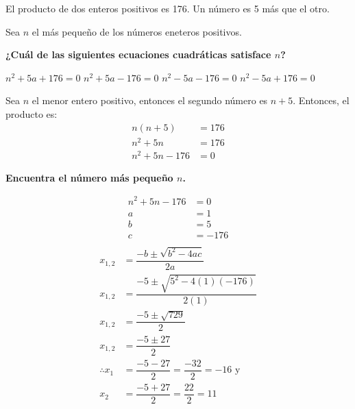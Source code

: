 El producto de dos enteros positivos es 176. Un número es 5 más que el otro.

Sea $n$ el más pequeño de los números eneteros positivos.\\
\begin{subparts}
    \subpart  \textbf{¿Cuál de las siguientes ecuaciones cuadráticas satisface $n$?}

    \begin{oneparchoices}
        \choice $n^2+5a+176=0$
        \CorrectChoice $n^2+5a-176=0$
        \choice $n^2-5a-176=0$
        \choice $n^2-5a+176=0$
    \end{oneparchoices}

    \begin{solutionbox}{4cm}
        Sea $n$ el menor entero positivo, entonces el segundo número es $n+5$. Entonces, el producto es:
        \begin{align*}
            n(n+5)     & =176 \\
            n^2+5n     & =176 \\
            n^2+5n-176 & =0
        \end{align*}
    \end{solutionbox}

    \subpart \textbf{Encuentra el número más pequeño $n$.}

    \begin{solutionbox}{13cm}
        \begin{align*}
            n^2+5n-176 & =0    \\
            a          & =1    \\
            b          & =5    \\
            c          & =-176 \\
        \end{align*}
        \begin{align*}
            x_{1,2}        & = \dfrac{-b\pm\sqrt{b^2-4ac}}{2a}                \\[1.5em]
            x_{1,2}        & = \dfrac{-5\pm\sqrt{5^2-4(1)(-176)}}{2(1)}       \\[1.5em]
            x_{1,2}        & = \dfrac{-5\pm\sqrt{729}}{2}                     \\[1.5em]
            x_{1,2}        & = \dfrac{-5\pm 27}{2}                            \\[1.5em]
            \therefore x_1 & = \dfrac{-5-27}{2}=\dfrac{-32}{2}=-16 \text{ y } \\[1.5em]
            x_2            & = \dfrac{-5+27}{2}=\dfrac{22}{2}=11              \\[1.5em]
        \end{align*}
    \end{solutionbox}
\end{subparts}